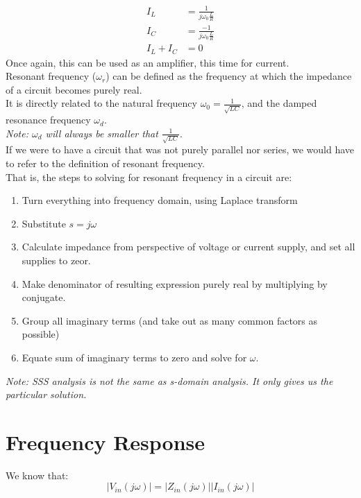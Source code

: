 \documentclass[nobib]{tufte-handout}
\begin{document}
\begin{align*}
    I_L     & = \frac{1}{j\omega_0\frac{L}{R}}  \\
    I_C     & = \frac{-1}{j\omega_0\frac{L}{R}} \\
    I_L+I_C & = 0
\end{align*}
Once again, this can be used as an amplifier, this time for current.\\
Resonant frequency ($\omega_r$) can be defined as the frequency at which the impedance of a circuit becomes purely real.\\
It is directly related to the natural frequency $\omega_0 = \frac{1}{\sqrt{LC}}$, and the damped resonance frequency $\omega_d$.\\
\textit{Note: $\omega_d$ will always be smaller that $\frac{1}{\sqrt{LC}}$}.\\
If we were to have a circuit that was not purely parallel nor series, we would have to refer to the definition of resonant frequency.\\
That is, the steps to solving for resonant frequency in a circuit are:
\begin{enumerate}
    \item Turn everything into frequency domain, using Laplace transform\\
    \item Substitute $s=j\omega$
    \item Calculate impedance from perspective of voltage or current supply, and set all
          supplies to zeor.
    \item Make denominator of resulting expression purely real by multiplying by
          conjugate.
    \item Group all imaginary terms (and take out as many common factors as possible)
    \item Equate sum of imaginary terms to zero and solve for $\omega$.
\end{enumerate}
\textit{Note: SSS analysis is not the same as s-domain analysis. It only gives us the particular solution.}
\section{Frequency Response}
We know that:
\begin{equation*}
    |V_{in}(j\omega)|=|Z_{in}(j\omega)||I_{in}(j\omega)|
\end{equation*}
\end{document}
